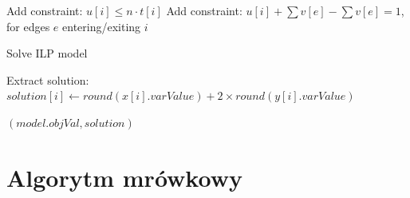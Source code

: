 \begin{algorithm}
\begin{algorithmic}[1]
             
                \State Add constraint: $u[i] \leq n \cdot t[i]$
                \State Add constraint: $u[i] + \sum v[e] - \sum v[e] = 1$, for edges $e$ entering/exiting $i$
            \EndFor
    
            \State Solve ILP model
    
            \State Extract solution:
                \State $solution[i] \gets round(x[i].varValue) + 2 \times round(y[i].varValue)$
            \EndFor
    
            \State \Return $(model.objVal, solution)$
        \EndFunction
    \end{algorithmic}
    \end{algorithm}

\FloatBarrier
\section{Algorytm mrówkowy}


